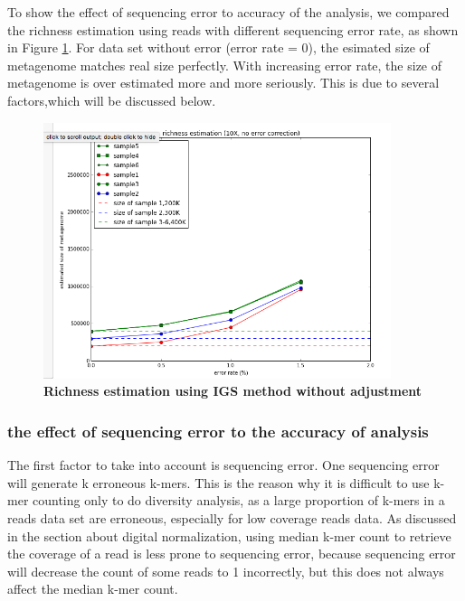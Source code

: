 \documentclass[12pt]{report}
\begin{document}
To show the effect of sequencing error to accuracy of the 
analysis, we compared the richness estimation using reads with different 
sequencing error rate, as shown in Figure \ref{fig:IGS_richness_no_adjustment}. 
For data set without error (error rate = 0), the esimated size of metagenome
matches real size perfectly. With increasing error rate, the size of metagenome
is over estimated more and more seriously. This is due to several factors,which
will be discussed below. 
\begin{figure}[!ht]
 \centerline{\includegraphics[width=4in]{./figures/IGS_richness_no_adjustment.png}}
\caption{\bf Richness estimation using IGS method without adjustment}
\label{fig:IGS_richness_no_adjustment}
\end{figure}

\subsubsection{the effect of sequencing error to the accuracy of analysis}
The first factor to take into account is sequencing error. One sequencing error
will generate k erroneous k-mers. This is the reason why it is difficult to use
k-mer counting only to do diversity analysis, as a large proportion of k-mers
in a reads data set are erroneous, especially for low coverage reads data. As
discussed in the section about digital normalization, using median k-mer count
to retrieve the coverage of a read is less prone to sequencing error, because
sequencing error will decrease the count of some reads to 1 incorrectly, but
this does not always affect the median k-mer count. 
\end{document}
